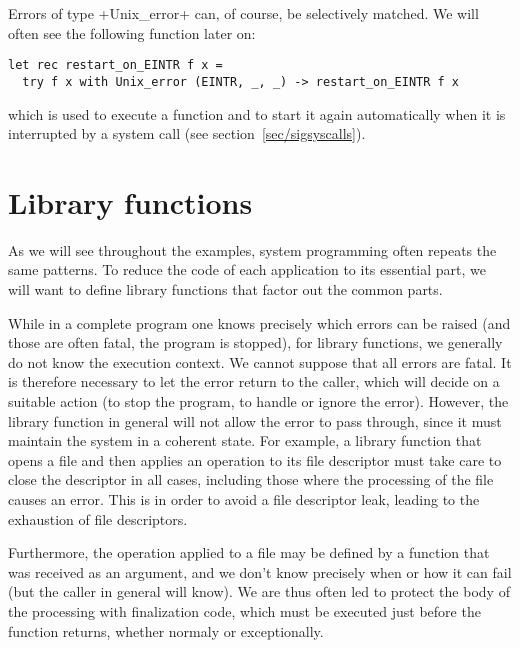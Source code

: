 Errors of type \ml+Unix_error+  can, of course, be
selectively matched. We will often see the following
function later on:
%
\begin{lstlisting}
let rec restart_on_EINTR f x = 
  try f x with Unix_error (EINTR, _, _) -> restart_on_EINTR f x 
\end{lstlisting}
%
which is used to execute a function and to start it again automatically
when it is interrupted by a system call (see section~\ref{sec/sigsyscalls}).

\section{Library functions}

As we will see throughout the examples, system programming often
repeats the same patterns. To reduce the code of each application to
its essential part, we will want to define library functions that
factor out the common parts.

While in a complete program one knows precisely which errors can be
raised (and those are often fatal, the program is stopped), for
library functions, we generally do not know the execution context. We
cannot suppose that all errors are fatal. It is therefore necessary to
let the error return to the caller, which will decide on a suitable
action (to stop the program, to handle or ignore the error). However,
the library function in general will not allow the error to pass
through, since it must maintain the system in a coherent state. For
example, a library function that opens a file and then applies an
operation to its file descriptor must take care to close the
descriptor in all cases, including those where the processing of the
file causes an error. This is in order to avoid a file descriptor
leak, leading to the exhaustion of file descriptors.

Furthermore, the operation applied to a file may be defined by a
function that was received as an argument, and we don't know precisely
when or how it can fail (but the caller in general will know). We are
thus often led to protect the body of the processing with \quotes
{finalization} code, which must be executed just before the function
returns, whether normaly or exceptionally.

